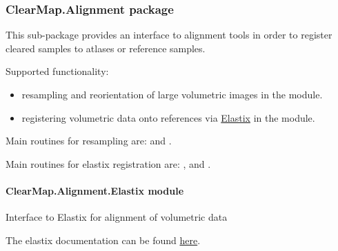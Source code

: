 \documentclass[letterpaper,10pt,english]{sphinxmanual}
\begin{document}
\subsubsection{ClearMap.Alignment package}
\label{api/ClearMap.Alignment::doc}\label{api/ClearMap.Alignment:clearmap-alignment-package}\label{api/ClearMap.Alignment:module-ClearMap.Alignment}
This sub-package provides an interface to alignment tools in order to
register cleared samples to atlases or reference samples.

Supported functionality:
\begin{itemize}
\item {} 
resampling and reorientation of large volumetric images in the
{\hyperref[api/ClearMap.Alignment:module-ClearMap.Alignment.Resampling]{\emph{}}} module.

\item {} 
registering volumetric data onto references via
\href{http://elastix.isi.uu.nl/}{Elastix} in the
{\hyperref[api/ClearMap.Alignment:module-ClearMap.Alignment.Elastix]{\emph{}}} module.

\end{itemize}

Main routines for resampling are:
{\hyperref[api/ClearMap.Alignment:ClearMap.Alignment.Resampling.resampleData]{\emph{}}}
and {\hyperref[api/ClearMap.Alignment:ClearMap.Alignment.Resampling.resamplePoints]{\emph{}}}.

Main routines for elastix registration are:
{\hyperref[api/ClearMap.Alignment:ClearMap.Alignment.Elastix.alignData]{\emph{}}},
{\hyperref[api/ClearMap.Alignment:ClearMap.Alignment.Elastix.transformData]{\emph{}}} and
{\hyperref[api/ClearMap.Alignment:ClearMap.Alignment.Elastix.transformPoints]{\emph{}}}.


\paragraph{ClearMap.Alignment.Elastix module}
\label{api/ClearMap.Alignment:clearmap-alignment-elastix-module}\label{api/ClearMap.Alignment:module-ClearMap.Alignment.Elastix}
Interface to Elastix for alignment of volumetric data

The elastix documentation can be found \href{http://elastix.isi.uu.nl/}{here}.
\end{document}
